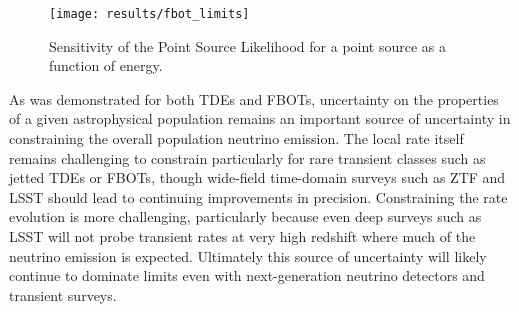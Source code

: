 \begin{figure}[!ht]
	\centering \texttt{[image: results/fbot\_limits]}
	\caption{Sensitivity of the Point Source Likelihood for a point source as a function of energy.}
	\label{fig:sens_disc_energy}
\end{figure}

As was demonstrated for both TDEs and FBOTs, uncertainty on the properties of a given astrophysical population remains an important source of uncertainty in constraining the overall population neutrino emission. The local rate itself remains challenging to constrain particularly for rare transient classes such as jetted TDEs or FBOTs, though wide-field time-domain surveys such as ZTF and LSST should lead to continuing improvements in precision. Constraining the rate evolution is more challenging, particularly because even deep surveys such as LSST will not probe transient rates at very high redshift where much of the neutrino emission is expected. Ultimately this source of uncertainty will likely continue to dominate limits even with next-generation neutrino detectors and transient surveys.